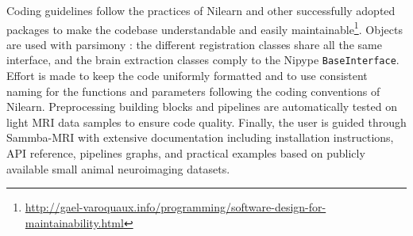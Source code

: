 \documentclass[utf8, a4paper, final, crop]{frontiersSCNS}
\newcommand{\pythoninline}[1]{\texttt{#1}}
\begin{document}
Coding guidelines follow the %
practices of Nilearn and other successfully adopted packages
\citep[e.g. Scikit-learn][]{pedregosa2011scikit} 
to make the codebase understandable and easily maintainable\footnote{\url{http://gael-varoquaux.info/programming/software-design-for-maintainability.html}}.
%
%
%
Objects are used with parsimony : the different registration classes share
all the same interface, and the brain extraction
classes comply to the Nipype \pythoninline{BaseInterface}.
Effort is made to keep the code uniformly formatted and to use consistent 
naming for the functions and parameters 
following the coding conventions of Nilearn.
Preprocessing building blocks and pipelines are automatically tested on light MRI 
data samples to ensure code quality.
%
Finally, the user is guided through Sammba-MRI with 
extensive documentation including installation instructions, API reference,
pipelines graphs, and practical examples based on publicly available small animal 
neuroimaging datasets.
%
%
%
\end{document}
